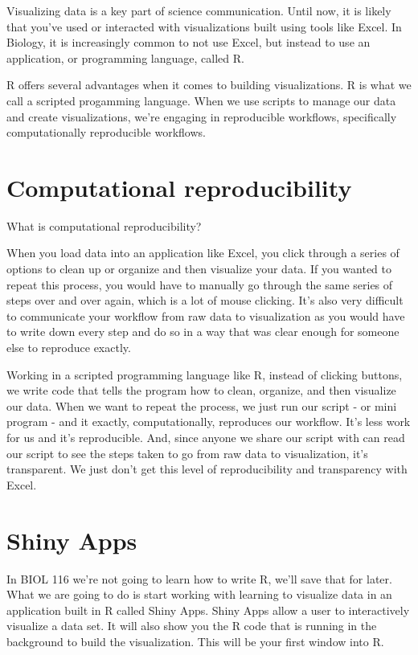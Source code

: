 \documentclass[
]{book}
\begin{document}
Visualizing data is a key part of science communication. Until now, it is likely that you've used or interacted with visualizations built using tools like Excel. In Biology, it is increasingly common to not use Excel, but instead to use an application, or programming language, called R.

R offers several advantages when it comes to building visualizations. R is what we call a scripted progamming language. When we use scripts to manage our data and create visualizations, we're engaging in reproducible workflows, specifically computationally reproducible workflows.

\hypertarget{computational-reproducibility}{%
\section*{Computational reproducibility}\label{computational-reproducibility}}

What is computational reproducibility?

When you load data into an application like Excel, you click through a series of options to clean up or organize and then visualize your data. If you wanted to repeat this process, you would have to manually go through the same series of steps over and over again, which is a lot of mouse clicking. It's also very difficult to communicate your workflow from raw data to visualization as you would have to write down every step and do so in a way that was clear enough for someone else to reproduce exactly.

Working in a scripted programming language like R, instead of clicking buttons, we write code that tells the program how to clean, organize, and then visualize our data. When we want to repeat the process, we just run our script - or mini program - and it exactly, computationally, reproduces our workflow. It's less work for us and it's reproducible. And, since anyone we share our script with can read our script to see the steps taken to go from raw data to visualization, it's transparent. We just don't get this level of reproducibility and transparency with Excel.

\hypertarget{shiny-apps}{%
\section*{Shiny Apps}\label{shiny-apps}}

In BIOL 116 we're not going to learn how to write R, we'll save that for later. What we are going to do is start working with learning to visualize data in an application built in R called Shiny Apps. Shiny Apps allow a user to interactively visualize a data set. It will also show you the R code that is running in the background to build the visualization. This will be your first window into R.
\end{document}
